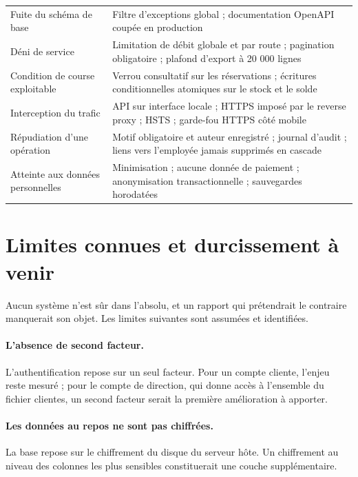\begin{table}[H]
\begin{tabularx}{\textwidth}{L{4.2cm} X}
Fuite du schéma de base &
Filtre d'exceptions global ; documentation OpenAPI coupée en production \\

Déni de service &
Limitation de débit globale et par route ; pagination obligatoire ; plafond
d'export à 20 000 lignes \\

Condition de course exploitable &
Verrou consultatif sur les réservations ; écritures conditionnelles atomiques
sur le stock et le solde \\

Interception du trafic &
API sur interface locale ; HTTPS imposé par le reverse proxy ; HSTS ;
garde-fou HTTPS côté mobile \\

Répudiation d'une opération &
Motif obligatoire et auteur enregistré ; journal d'audit ; liens vers
l'employée jamais supprimés en cascade \\

Atteinte aux données personnelles &
Minimisation ; aucune donnée de paiement ; anonymisation transactionnelle ;
sauvegardes horodatées \\
\bottomrule
\end{tabularx}
\end{table}

\section{Limites connues et durcissement à venir}

Aucun système n'est sûr dans l'absolu, et un rapport qui prétendrait le
contraire manquerait son objet. Les limites suivantes sont assumées et
identifiées.

\paragraph{L'absence de second facteur.} L'authentification repose sur un seul
facteur. Pour un compte cliente, l'enjeu reste mesuré ; pour le compte de
direction, qui donne accès à l'ensemble du fichier clientes, un second facteur
serait la première amélioration à apporter.

\paragraph{Les données au repos ne sont pas chiffrées.} La base repose sur le
chiffrement du disque du serveur hôte. Un chiffrement au niveau des colonnes
les plus sensibles constituerait une couche supplémentaire.

